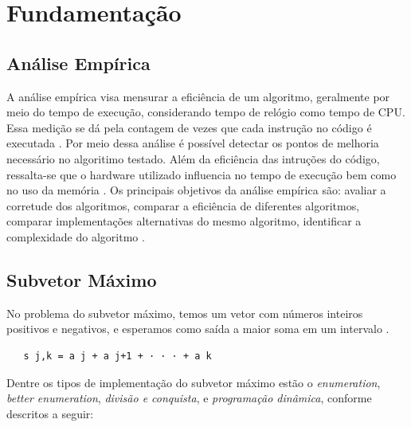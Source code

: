 \documentclass[
	12pt,				%
	oneside,   	        %
	a4paper,			%
	english,			%
	french,				%
	spanish,			%
	brazil,				%
	]{pacotes/abntex2}
\begin{document}
\section{Fundamentação}
\label{sec:fundamentacao}
\subsection{Análise Empírica}
A análise empírica visa mensurar a eficiência de um algoritmo, geralmente por meio do tempo de execução,
considerando tempo de relógio como tempo de CPU. Essa medição se dá pela contagem de vezes que cada instrução
no código é executada \cite{heineman:16}. Por meio dessa análise é possível detectar os pontos de melhoria necessário no algoritimo
testado.
Além da eficiência das intruções do código, ressalta-se que o hardware utilizado influencia no tempo de execução
bem como no uso da memória \cite{heineman:16}.
Os principais objetivos da análise empírica são: avaliar a corretude dos algoritmos, comparar a eficiência de diferentes algoritmos, comparar implementações alternativas do mesmo algoritmo, identificar a complexidade do algoritmo \cite{bentley:84}. 

\subsection{Subvetor Máximo}
No problema do subvetor máximo, temos um vetor com números inteiros positivos e negativos, e esperamos como saída a maior soma em um intervalo \cite{heineman:16}.

\begin{verbatim}
   s j,k = a j + a j+1 + · · · + a k 
\end{verbatim}

Dentre os tipos de implementação do subvetor máximo estão o \textit{enumeration}, \textit{better enumeration}, \textit{divisão e conquista}, e \textit{programação dinâmica}, conforme descritos a seguir:
\end{document}
